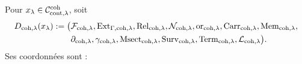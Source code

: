 Pour \(x_\lambda\in\mathcal C_{{\rm cont},\lambda}^{\rm coh}\), soit
\begin{equation}\label{eq:pdfv2-coh-d-package}
 \begin{aligned}
 D_{{\rm coh},\lambda}(x_\lambda):=\bigl(&
 \mathcal F_{{\rm coh},\lambda},
 \operatorname{Ext}_{\Gamma,{\rm coh},\lambda},
 \operatorname{Rel}_{{\rm coh},\lambda},
 \mathcal N_{{\rm coh},\lambda},
 \operatorname{or}_{{\rm coh},\lambda},
 \operatorname{Carr}_{{\rm coh},\lambda},
 \operatorname{Mem}_{{\rm coh},\lambda},\\
 &\partial_{{\rm coh},\lambda},
 \gamma_{{\rm coh},\lambda},
 \operatorname{Msect}_{{\rm coh},\lambda},
 \operatorname{Surv}_{{\rm coh},\lambda},
 \operatorname{Term}_{{\rm coh},\lambda},
 \mathcal L_{{\rm coh},\lambda}\bigr).
 \end{aligned}
\end{equation}
Ses coordonnées sont :
